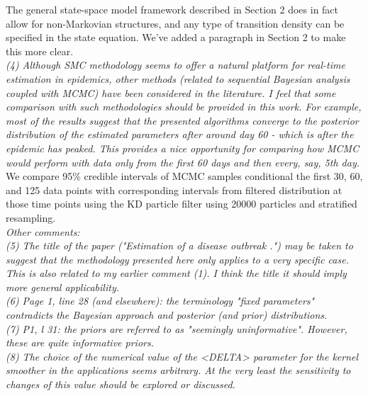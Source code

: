 \documentclass{article}
\begin{document}
The general state-space model framework described in Section 2 does in fact allow for non-Markovian structures, and any type of transition density can be specified in the state equation. We've added a paragraph in Section 2 to make this more clear. \\

\noindent \emph{(4) Although SMC methodology seems to offer a natural platform for real-time estimation in epidemics, other methods (related to sequential Bayesian analysis coupled with MCMC) have been considered in the literature. I feel that some comparison with such methodologies should be provided in this work. For example, most of the results suggest that the presented algorithms converge to the posterior distribution of the estimated parameters after around day 60 - which is after the epidemic has peaked. This provides a nice opportunity for comparing how MCMC would perform with data only from the first 60 days and then every, say, 5th day.} \\

We compare 95\% credible intervals of MCMC samples conditional the first 30, 60, and 125 data points with corresponding intervals from filtered distribution at those time points using the KD particle filter using 20000 particles and stratified resampling. \\

\noindent \emph{Other comments:} \\

\noindent \emph{(5) The title of the paper  ("Estimation of a disease outbreak .") may be taken to suggest that the methodology presented here only applies to a very specific case. This is also related to my earlier comment (1). I think the title  it should imply more general applicability.} \\

\noindent \emph{(6) Page 1, line 28 (and elsewhere): the terminology "fixed parameters" contradicts the Bayesian approach and posterior (and prior) distributions.} \\

\noindent \emph{(7) P1, l 31: the priors are referred to as "seemingly uninformative". However, these are quite informative priors.} \\

\noindent \emph{(8) The choice of the numerical value of the <DELTA> parameter for the kernel smoother in the applications seems arbitrary. At the very least the sensitivity to changes of this value should be explored or discussed.} \\
\end{document}
